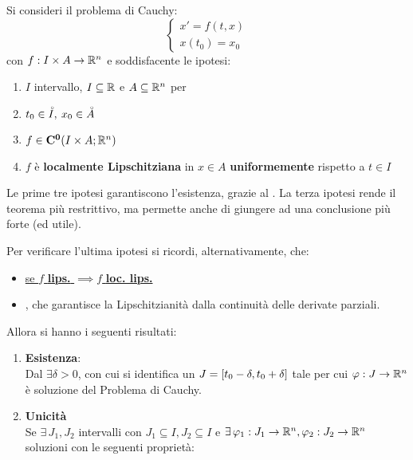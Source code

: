 \begin{theorem}
	\label{teo:cau_locale_part_1}
	Si consideri il problema di Cauchy:
	\[\begin{cases}x'=f(t,x)\\x(t_0)=x_0\end{cases}\]
	con $f:I\times A \to \mathbb{R}^n$ e soddisfacente le ipotesi:
	\begin{enumerate}
		\item $I$ intervallo, $I \subseteq \mathbb{R}$ e $A\subseteq \mathbb{R}^n$ per 
		\item $t_0\in \accentset{\circ}{I},\:x_0\in \accentset{\circ}{A}$
		\item $f\in \mathbf{C^{0}}(I\times A; \mathbb{R}^n)$
		\item $f$ è \textbf{localmente Lipschitziana} in $x\in A$ \textbf{uniformemente} rispetto a $t\in I$
	\end{enumerate}
	\begin{note}
		Le prime tre ipotesi garantiscono l'esistenza, grazie al . La terza ipotesi rende il teorema più restrittivo, ma permette anche di giungere ad una conclusione più forte (ed utile).
	\end{note}
		\begin{note}
		Per verificare l'ultima ipotesi si ricordi, alternativamente, che:
		\begin{itemize}[nolistsep]
			\item \hyperlink{note:if_lips_then_loclips}{se $f$ \textbf{lips.} $\implies f$ \textbf{loc. lips.}}
			\item {}, che garantisce la Lipschitzianità dalla continuità delle derivate parziali.
		\end{itemize}
	\end{note}
	Allora si hanno i seguenti risultati:
	\begin{enumerate}
		\item \textbf{Esistenza}:\\
		Dal  $\exists \delta>0$, con cui si identifica un $J=\left[t_0-\delta,t_0+\delta\right]$ tale per cui $\varphi : J \to \mathbb{R}^n$ è soluzione del Problema di Cauchy.
		\item \textbf{Unicità}\\
		Se $\exists\,J_1,J_2$ intervalli con $J_1\subseteq I,J_2\subseteq I$ e $\exists\,\varphi_1:J_1\to \mathbb{R}^n, \varphi_2:J_2\to \mathbb{R}^n$ soluzioni con le seguenti proprietà:
		\begin{itemize}

\end{itemize}
\end{enumerate}
\end{theorem}

